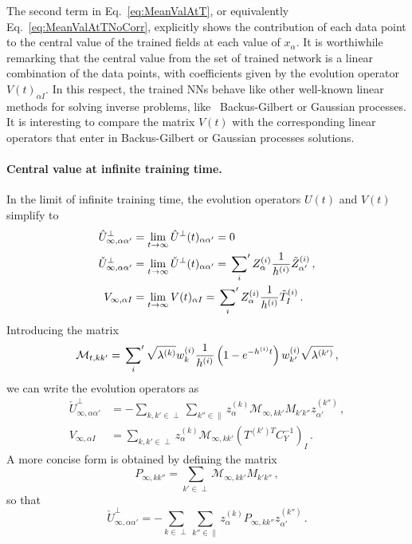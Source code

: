 The second term in Eq.~\eqref{eq:MeanValAtT}, or equivalently Eq.~\eqref{eq:MeanValAtTNoCorr}, explicitly shows the contribution
of each data point to the central value of the
trained fields at each value of $x_{\alpha}$. It is worthiwhile remarking that the central value
from the set of trained network is a linear combination of the data points, with coefficients given by the
evolution operator $V(t)_{\alpha I}$. In this respect, the trained NNs behave like other well-known linear methods for 
solving inverse problems, like \eg\ Backus-Gilbert or Gaussian processes. It is interesting to compare the matrix $V(t)$ with 
the corresponding linear operators that enter in Backus-Gilbert or Gaussian processes solutions. 

\paragraph{Central value at infinite training time.}

In the limit of infinite training time, the evolution operators $U(t)$ and $V(t)$ simplify to
\begin{align}
    \hat{U}^\perp_{\infty, \alpha\alpha'}
        &= \lim_{t\to\infty}\hat{U}^\perp(t)_{\alpha\alpha'} = 0\, \\
    \check{U}^\perp_{\infty,\alpha\alpha'}
        &= \lim_{t\to\infty}\check{U}^\perp(t)_{\alpha\alpha'}
            = \sideset{}{'}\sum_{i} Z^{(i)}_{\alpha} \frac{1}{h^{(i)}} \tilde{Z}^{(i)}_{\alpha'}\, , \\
    V_{\infty,\alpha I}
        &= \lim_{t\to\infty}V(t)_{\alpha I}
            = \sideset{}{'}\sum_{i} Z^{(i)}_{\alpha} \frac{1}{h^{(i)}} \tilde{T}^{(i)}_{I}\, .
\end{align}
Introducing the matrix
\begin{align}
    \label{eq:calMDef}
    \mathcal{M}_{t,kk'}
        = \sideset{}{'}\sum_{i} \sqrt{\lambda^{(k)}} w^{(i)}_{k} \frac{1}{h^{(i)}}
            \left(1 - e^{-h^{(i)}t}\right) w^{(i)}_{k'} \sqrt{\lambda^{(k')}} \, ,
\end{align}
we can write the evolution operators as
\begin{align}
    \label{eq:UcheckInfty}
    \check{U}^\perp_{\infty,\alpha\alpha'}
        &= -\sum_{k,k'\in\perp} \sum_{k''\in\parallel} z^{(k)}_{\alpha} \mathcal{M}_{\infty,kk'} M_{k'k''} z^{(k'')}_{\alpha'}\, , \\
    \label{eq:VInfty}
    V_{\infty, \alpha I}
        &= \sum_{k,k'\in\perp} z^{(k)}_{\alpha} \mathcal{M}_{\infty,kk'}
            \left(T^{(k') T} C_{Y}^{-1}\right)_I \, .
\end{align}
A more concise form is obtained by defining the matrix
\begin{equation}
    \label{eq:PInftyDef}
    P_{\infty,kk''} = \sum_{k'\in\perp} \mathcal{M}_{\infty,kk'} M_{k'k''}\, ,
\end{equation}
so that
\begin{equation}
    \label{eq:UcheckInftyV2}
    \check{U}^\perp_{\infty,\alpha\alpha'} = -\sum_{k\in\perp} \sum_{k''\in\parallel} z^{(k)}_{\alpha} P_{\infty,kk''} z^{(k'')}_{\alpha'}\, .
\end{equation}

